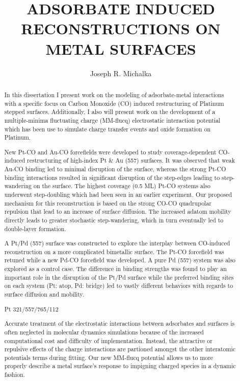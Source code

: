 \documentclass[draft]{nddiss2e}
\begin{document}
\begin{abstract}
\title{ADSORBATE INDUCED RECONSTRUCTIONS ON METAL SURFACES}
\author{Joseph R. Michalka}
In this dissertation I present work on the modeling of adsorbate-metal
interactions with a specific focus on Carbon Monoxide (CO) induced
restructuring of Platinum stepped surfaces. Additionally, I also will present
work on the development of a multiple-minima fluctuating charge (MM-flucq)
electrostatic interaction potential which has been use to simulate charge
transfer events and  oxide formation on Platinum.

New Pt-CO and Au-CO forcefields were developed to study coverage-dependent
CO-induced restructuring of high-index Pt \& Au (557) surfaces. It was observed
that weak Au-CO binding led to minimal disruption of the surface, whereas the
strong Pt-CO binding interactions resulted in significant disruption of the
step-edges leading to step-wandering on the surface. The highest coverage (0.5
ML) Pt-CO systems also underwent step-doubling which had been seen in an
earlier experiment. Our proposed mechanism for this reconstruction is based on
the strong CO-CO quadrupolar repulsion that lead to an increase of surface
diffusion. The increased adatom mobility directly leads to greater stochastic
step-wandering, which in turn eventually led to double-layer formation.

A Pt/Pd (557) surface was constructed to explore the interplay between
CO-induced reconstruction on a more complicated bimetallic surface. The Pt-CO
forcefield was retuned while a new Pd-CO forcefield was developed. A pure Pd
(557) system was also explored as a control case. The difference in binding
strengths was found to play an important role in the disruption of the Pt/Pd
surface while the preferred binding sites on each system (Pt: atop, Pd: bridge)
led to vastly different behaviors with regards to surface diffusion and
mobility.

Pt 321/557/765/112


Accurate treatment of the electrostatic interactions between adsorbates and
surfaces is often neglected in molecular dynamics simulations because of the
increased computational cost and difficulty of implementation. Instead, the
attractive or repulsive effects of the charge interactions are partioned
amongst the other interatomic potentials terms during fitting. Our new MM-flucq
potential allows us to more properly describe a metal surface's response to
impigning charged species in a dynamic fashion.

\end{abstract}
\end{document}
